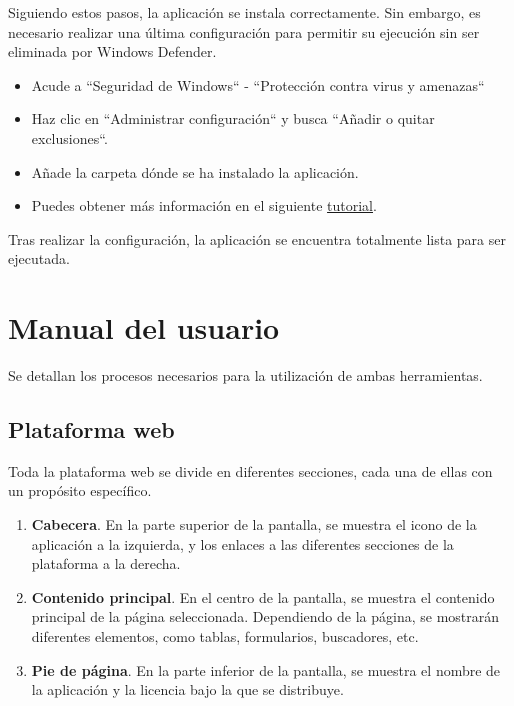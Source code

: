 


Siguiendo estos pasos, la aplicación se instala correctamente.
Sin embargo, es necesario realizar una última configuración para permitir su ejecución sin ser eliminada por Windows
Defender.

\begin{itemize}
    \item Acude a ``Seguridad de Windows`` - ``Protección contra virus y amenazas``
    \item Haz clic en ``Administrar configuración`` y busca ``Añadir o quitar exclusiones``.
    \item Añade la carpeta dónde se ha instalado la aplicación.
    \item Puedes obtener más información en el siguiente
    \href{https://consumer.huawei.com/es/support/content/es-es00694627/#:~:text=Acceda%20a%20Seguridad%20de%20Windows,o%20quitar%20exclusiones%20en%20Exclusiones.}
    {tutorial}.
\end{itemize}

Tras realizar la configuración, la aplicación se encuentra totalmente lista para ser ejecutada.


\section{Manual del usuario}

Se detallan los procesos necesarios para la utilización de ambas herramientas.

\subsection{Plataforma web}

Toda la plataforma web se divide en diferentes secciones, cada una de ellas con un propósito específico.
\begin{enumerate}
    \item \textbf{Cabecera}.
    En la parte superior de la pantalla, se muestra el icono de la aplicación a la izquierda, y los
    enlaces a las diferentes secciones de la plataforma a la derecha.
    \item \textbf{Contenido principal}.
    En el centro de la pantalla, se muestra el contenido principal de la página
    seleccionada.
    Dependiendo de la página, se mostrarán diferentes elementos, como tablas, formularios, buscadores, etc.
    \item \textbf{Pie de página}.
    En la parte inferior de la pantalla, se muestra el nombre de la aplicación y la licencia
    bajo la que se distribuye.
\end{enumerate}

